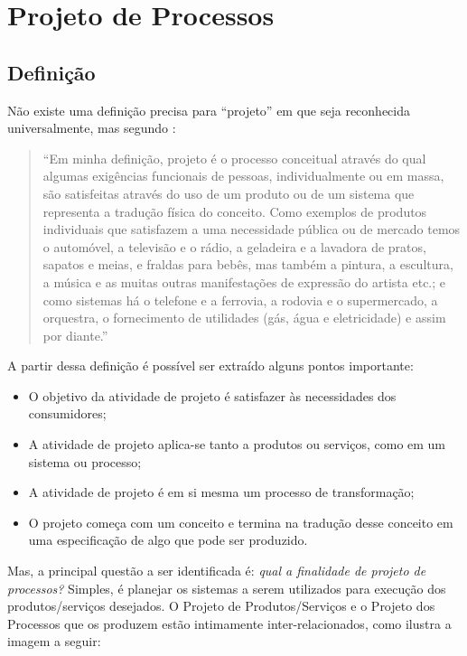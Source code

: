 \chapter[Projeto de Processos]{Projeto de Processos}
\label{chap:processos}

	\section[Definição]{Definição}
	\label{sec:processos_definicao}
	
		Não existe uma definição precisa para “projeto” em que seja reconhecida universalmente, mas segundo \cite{sir}: 

		\begin{quotation}
			“Em minha definição, projeto é o processo conceitual através do qual algumas exigências funcionais de pessoas, individualmente ou em massa, são satisfeitas através do uso de um produto ou de um sistema que representa a tradução física do conceito. Como exemplos de produtos individuais que satisfazem a uma necessidade pública ou de mercado temos o automóvel, a televisão e o rádio, a geladeira e a lavadora de pratos, sapatos e meias, e fraldas para bebês, mas também a pintura, a escultura, a música e as muitas outras manifestações de expressão do artista etc.; e como sistemas há o telefone e a ferrovia, a rodovia e o supermercado, a orquestra, o fornecimento de utilidades (gás, água e eletricidade) e assim por diante.”
		\end{quotation}

		A partir dessa definição é possível ser extraído alguns pontos importante:

		\begin{itemize}
			\item{O objetivo da atividade de projeto é satisfazer às necessidades dos consumidores;}
			\item{A atividade de projeto aplica-se tanto a produtos ou serviços, como em um sistema ou processo;}
			\item{A atividade de projeto é em si mesma um processo de transformação;}
			\item{O projeto começa com um conceito e termina na tradução desse conceito em uma especificação de algo que pode ser produzido.}
		\end{itemize}

		Mas, a principal questão a ser identificada é: \emph{qual a finalidade de projeto de processos?} Simples, é planejar os sistemas a serem utilizados para execução dos produtos/serviços desejados. O Projeto de Produtos/Serviços e o Projeto dos Processos que os produzem estão intimamente inter-relacionados, como ilustra a imagem a seguir:

